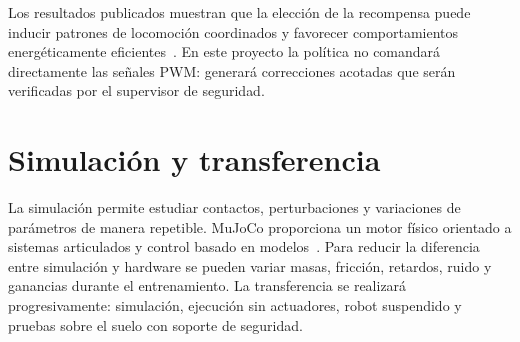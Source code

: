 Los resultados publicados muestran que la elección de la recompensa puede inducir patrones de locomoción coordinados y favorecer comportamientos energéticamente eficientes~\cite{heess2017emergence,fu2021energy}. En este proyecto la política no comandará directamente las señales PWM: generará correcciones acotadas que serán verificadas por el supervisor de seguridad.

\section{Simulación y transferencia}

La simulación permite estudiar contactos, perturbaciones y variaciones de parámetros de manera repetible. MuJoCo proporciona un motor físico orientado a sistemas articulados y control basado en modelos~\cite{todorov2012mujoco}. Para reducir la diferencia entre simulación y hardware se pueden variar masas, fricción, retardos, ruido y ganancias durante el entrenamiento. La transferencia se realizará progresivamente: simulación, ejecución sin actuadores, robot suspendido y pruebas sobre el suelo con soporte de seguridad.
